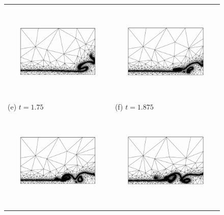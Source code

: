 \begin{figure}[tbp]
\begin{center}
\begin{tabular}{ll}
\includegraphics[width=7cm, trim=2.5cm 4.5cm 2.5cm 4.5cm, clip=true]{examples_images/water_collapse/water_collapse_300_mesh.pdf} & \includegraphics[width=7cm, trim=2.5cm 4.5cm 2.5cm 4.5cm, clip=true]{examples_images/water_collapse/water_collapse_325_mesh.pdf} \\
(e) $t = 1.75$ & (f) $t = 1.875$ \\
\includegraphics[width=7cm, trim=2.5cm 4.5cm 2.5cm 4.5cm, clip=true]{examples_images/water_collapse/water_collapse_350_mesh.pdf} & \includegraphics[width=7cm, trim=2.5cm 4.5cm 2.5cm 4.5cm, clip=true]{examples_images/water_collapse/water_collapse_375_mesh.pdf} \\

\end{tabular}
\end{center}
\end{figure}
